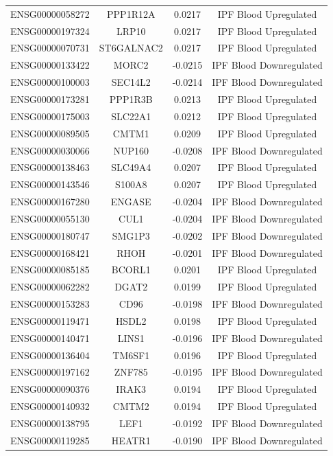 \documentclass[
]{article}
\begin{document}
\begin{singlespace}
\begin{longtable}[t]{lccc}
ENSG00000058272 & PPP1R12A & 0.0217 & IPF Blood Upregulated\\
ENSG00000197324 & LRP10 & 0.0217 & IPF Blood Upregulated\\
\addlinespace
ENSG00000070731 & ST6GALNAC2 & 0.0217 & IPF Blood Upregulated\\
ENSG00000133422 & MORC2 & -0.0215 & IPF Blood Downregulated\\
ENSG00000100003 & SEC14L2 & -0.0214 & IPF Blood Downregulated\\
ENSG00000173281 & PPP1R3B & 0.0213 & IPF Blood Upregulated\\
ENSG00000175003 & SLC22A1 & 0.0212 & IPF Blood Upregulated\\
\addlinespace
ENSG00000089505 & CMTM1 & 0.0209 & IPF Blood Upregulated\\
ENSG00000030066 & NUP160 & -0.0208 & IPF Blood Downregulated\\
ENSG00000138463 & SLC49A4 & 0.0207 & IPF Blood Upregulated\\
ENSG00000143546 & S100A8 & 0.0207 & IPF Blood Upregulated\\
ENSG00000167280 & ENGASE & -0.0204 & IPF Blood Downregulated\\
\addlinespace
ENSG00000055130 & CUL1 & -0.0204 & IPF Blood Downregulated\\
ENSG00000180747 & SMG1P3 & -0.0202 & IPF Blood Downregulated\\
ENSG00000168421 & RHOH & -0.0201 & IPF Blood Downregulated\\
ENSG00000085185 & BCORL1 & 0.0201 & IPF Blood Upregulated\\
ENSG00000062282 & DGAT2 & 0.0199 & IPF Blood Upregulated\\
\addlinespace
ENSG00000153283 & CD96 & -0.0198 & IPF Blood Downregulated\\
ENSG00000119471 & HSDL2 & 0.0198 & IPF Blood Upregulated\\
ENSG00000140471 & LINS1 & -0.0196 & IPF Blood Downregulated\\
ENSG00000136404 & TM6SF1 & 0.0196 & IPF Blood Upregulated\\
ENSG00000197162 & ZNF785 & -0.0195 & IPF Blood Downregulated\\
\addlinespace
ENSG00000090376 & IRAK3 & 0.0194 & IPF Blood Upregulated\\
ENSG00000140932 & CMTM2 & 0.0194 & IPF Blood Upregulated\\
ENSG00000138795 & LEF1 & -0.0192 & IPF Blood Downregulated\\
ENSG00000119285 & HEATR1 & -0.0190 & IPF Blood Downregulated\\

\end{longtable}
\end{singlespace}
\end{document}
